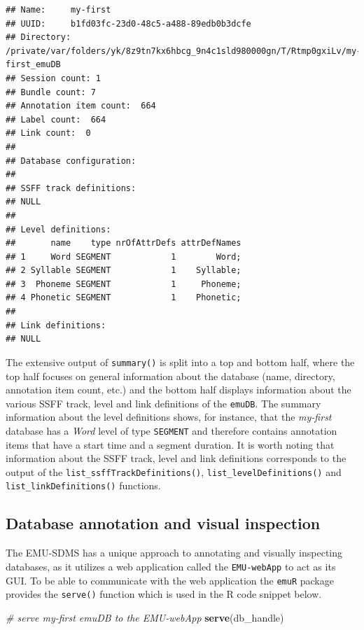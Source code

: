 \documentclass[]{book}
\newenvironment{Shaded}{\begin{snugshade}}{\end{snugshade}}
\newcommand{\CommentTok}[1]{\textcolor[rgb]{0.56,0.35,0.01}{\textit{#1}}}
\newcommand{\KeywordTok}[1]{\textcolor[rgb]{0.13,0.29,0.53}{\textbf{#1}}}
\newcommand{\NormalTok}[1]{#1}
\begin{document}
\begin{verbatim}
## Name:     my-first 
## UUID:     b1fd03fc-23d0-48c5-a488-89edb0b3dcfe 
## Directory:    /private/var/folders/yk/8z9tn7kx6hbcg_9n4c1sld980000gn/T/Rtmp0gxiLv/my-first_emuDB 
## Session count: 1 
## Bundle count: 7 
## Annotation item count:  664 
## Label count:  664 
## Link count:  0 
## 
## Database configuration:
## 
## SSFF track definitions:
## NULL
## 
## Level definitions:
##       name    type nrOfAttrDefs attrDefNames
## 1     Word SEGMENT            1        Word;
## 2 Syllable SEGMENT            1    Syllable;
## 3  Phoneme SEGMENT            1     Phoneme;
## 4 Phonetic SEGMENT            1    Phonetic;
## 
## Link definitions:
## NULL
\end{verbatim}

The extensive output of \texttt{summary()} is split into a top and bottom half, where the top half focuses on general information about the database (name, directory, annotation item count, etc.) and the bottom half displays information about the various SSFF track, level and link definitions of the \texttt{emuDB}. The summary information about the level definitions shows, for instance, that the \emph{my-first} database has a \emph{Word} level of type \texttt{SEGMENT} and therefore contains annotation items that have a start time and a segment duration. It is worth noting that information about the SSFF track, level and link definitions corresponds to the output of the \texttt{list\_ssffTrackDefinitions()}, \texttt{list\_levelDefinitions()} and \texttt{list\_linkDefinitions()} functions.

\hypertarget{database-annotation-and-visual-inspection}{%
\subsection{Database annotation and visual inspection}\label{database-annotation-and-visual-inspection}}

The EMU-SDMS has a unique approach to annotating and visually inspecting databases, as it utilizes a web application called the \texttt{EMU-webApp} to act as its GUI. To be able to communicate with the web application the \texttt{emuR} package provides the \texttt{serve()} function which is used in the R code snippet below.

\begin{Shaded}
\begin{Highlighting}[]
\CommentTok{# serve my-first emuDB to the EMU-webApp}
\KeywordTok{serve}\NormalTok{(db_handle)}
\end{Highlighting}
\end{Shaded}
\end{document}
